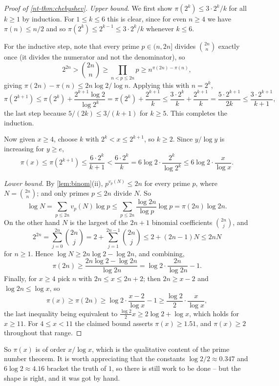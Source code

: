 \begin{proof}[Proof of \autoref{nt-thm:chebyshev}]
	\emph{Upper bound.} We first show $\pi(2^k) \leq 3 \cdot 2^k/k$ for all $k \geq 1$ by induction. For $1 \leq k \leq 6$ this is clear, since for even $n \geq 4$ we have $\pi(n) \leq n/2$ and so $\pi(2^k) \leq 2^{k-1} \leq 3\cdot2^k/k$ whenever $k \leq 6$.

	For the inductive step, note that every prime $p \in (n, 2n]$ divides $\binom{2n}n$ exactly once (it divides the numerator and not the denominator), so
	$$
	2^{2n} > \binom{2n}n \geq \prod_{n < p \leq 2n}p \geq n^{\pi(2n) - \pi(n)},
	$$
	giving $\pi(2n) - \pi(n) \leq 2n\log 2/\log n$. Applying this with $n = 2^k$,
	$$
	\pi(2^{k+1}) \leq \pi(2^k) + \frac{2^{k+1}\log 2}{\log 2^k} = \pi(2^k) + \frac{2^{k+1}}k \leq \frac{3\cdot2^k}k + \frac{2^{k+1}}k = \frac{5\cdot 2^{k+1}}{2k} \leq \frac{3\cdot2^{k+1}}{k+1},
	$$
	the last step because $5/(2k) \leq 3/(k+1)$ for $k \geq 5$. This completes the induction.

	Now given $x \geq 4$, choose $k$ with $2^k < x \leq 2^{k+1}$, so $k \geq 2$. Since $y/\log y$ is increasing for $y \geq e$,
	$$
	\pi(x) \leq \pi(2^{k+1}) \leq \frac{6 \cdot 2^k}{k+1} < \frac{6\cdot 2^k}{k} = 6\log 2\cdot\frac{2^k}{\log 2^k} \leq 6\log 2\cdot\frac{x}{\log x}.
	$$

	\emph{Lower bound.} By \autoref{lem:binom}(ii), $p^{v_p(N)} \leq 2n$ for every prime $p$, where $N = \binom{2n}n$; and only primes $p \leq 2n$ divide $N$. So
	$$
	\log N = \sum_{p \leq 2n}v_p(N)\log p \leq \sum_{p \leq 2n}\frac{\log 2n}{\log p}\log p = \pi(2n)\log 2n.
	$$
	On the other hand $N$ is the largest of the $2n+1$ binomial coefficients $\binom{2n}j$, and
	$$
	2^{2n} = \sum_{j=0}^{2n}\binom{2n}j = 2 + \sum_{j=1}^{2n-1}\binom{2n}j \leq 2 + (2n-1)N \leq 2nN
	$$
	for $n \geq 1$. Hence $\log N \geq 2n\log 2 - \log 2n$, and combining,
	$$
	\pi(2n) \geq \frac{2n\log 2 - \log 2n}{\log 2n} = \log 2\cdot\frac{2n}{\log 2n} - 1.
	$$
	Finally, for $x \geq 4$ pick $n$ with $2n \leq x \leq 2n+2$; then $2n \geq x - 2$ and $\log 2n \leq \log x$, so
	$$
	\pi(x) \geq \pi(2n) \geq \log 2\cdot\frac{x-2}{\log x} - 1 \geq \frac{\log 2}2\cdot\frac x{\log x},
	$$
	the last inequality being equivalent to $\frac{\log 2}2 x \geq 2\log 2 + \log x$, which holds for $x \geq 11$. For $4 \leq x < 11$ the claimed bound asserts $\pi(x) \geq 1.51$, and $\pi(x) \geq 2$ throughout that range.
\end{proof}

So $\pi(x)$ is of order $x/\log x$, which is the qualitative content of the prime number theorem. It is worth appreciating that the constants $\log 2/2 \approx 0.347$ and $6\log 2 \approx 4.16$ bracket the truth of $1$, so there is still work to be done -- but the shape is right, and it was got by hand.

